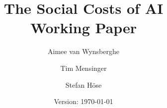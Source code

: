 \usepackage[T1]{fontenc}
\usepackage[utf8]{inputenc}
\usepackage[left=1in, right=1in, top=1in, bottom=1in]{geometry}
\usepackage[affil-it]{authblk}

\usepackage{amsmath}
\usepackage{amssymb}
\usepackage{hyperref}
\usepackage{mathpazo}
\usepackage{tgpagella}
\usepackage{xcolor}

\linespread{1.25}

\usepackage[backend=biber, style=ieee, autocite=inline, doi=false, url=true]{biblatex}
\setcounter{biburlnumpenalty}{85}  %

\renewcommand*{\bibfont}{\footnotesize}

\newcommand{\mycite}[1]{\citeauthor*{#1} (\citeyear{#1}, \cite{#1})}



\newcommand{\blue}[1]{\textcolor{bonnblue}{#1}}
\newcommand{\yellow}[1]{\textcolor{bonnyellow}{#1}}
\newcommand{\grey}[1]{\textcolor{bonngrey}{#1}}
\newcommand{\red}[1]{\textcolor{bonnred}{#1}}

\renewcommand\thefootnote{\blue{\arabic{footnote}}}

\hypersetup{
    colorlinks=true,
    urlcolor=bonnblue,
    citecolor=bonnblue,
    allcolors=bonnblue,
}


\title{\textbf{The Social Costs of AI}\\
    \Large \red{Working Paper}
}
\date{Version: \today}
\author[1]{Aimee van Wynsberghe}
\author[2]{Tim Mensinger}
\author[3]{Stefan H{\"o}se}
